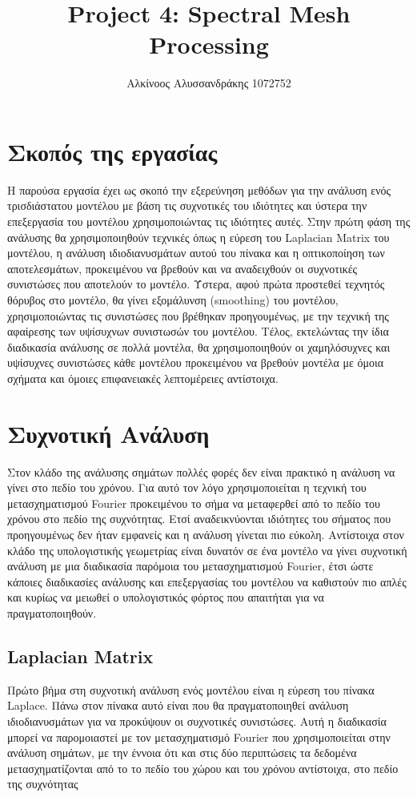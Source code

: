 \documentclass{article}
\title{Project 4: Spectral Mesh Processing}
\author{Αλκίνοος Αλυσσανδράκης 1072752}
\date{}
\begin{document}
\maketitle

\vfill
\tableofcontents
\vfill
\newpage

\section{Σκοπός της εργασίας}
Η παρούσα εργασία έχει ως σκοπό την εξερεύνηση μεθόδων για την ανάλυση ενός τρισδιάστατου
μοντέλου με βάση τις συχνοτικές του ιδιότητες και ύστερα την επεξεργασία του
μοντέλου χρησιμοποιώντας τις ιδιότητες αυτές. Στην πρώτη φάση της ανάλυσης θα
χρησιμοποιηθούν τεχνικές όπως η εύρεση του Laplacian Matrix του μοντέλου, η ανάλυση
ιδιοδιανυσμάτων αυτού του πίνακα και η οπτικοποίηση των αποτελεσμάτων, προκειμένου να
βρεθούν και να αναδειχθούν οι συχνοτικές συνιστώσες που αποτελούν το μοντέλο. Ύστερα,
αφού πρώτα προστεθεί τεχνητός θόρυβος στο μοντέλο, θα γίνει εξομάλυνση (smoothing) του
μοντέλου, χρησιμοποιώντας τις συνιστώσες που βρέθηκαν προηγουμένως, με την τεχνική της
αφαίρεσης των υψίσυχνων συνιστωσών του μοντέλου. Τέλος, εκτελώντας την ίδια διαδικασία
ανάλυσης σε πολλά μοντέλα, θα χρησιμοποιηθούν οι χαμηλόσυχνες και υψίσυχνες συνιστώσες
κάθε μοντέλου προκειμένου να βρεθούν μοντέλα με όμοια σχήματα και όμοιες επιφανειακές
λεπτομέρειες αντίστοιχα.

\section{Συχνοτική Ανάλυση}
Στον κλάδο της ανάλυσης σημάτων πολλές φορές δεν είναι πρακτικό η ανάλυση να γίνει στο
πεδίο του χρόνου. Για αυτό τον λόγο χρησιμοποιείται η τεχνική του μετασχηματισμού
Fourier προκειμένου το σήμα να μεταφερθεί από το πεδίο του χρόνου στο πεδίο της
συχνότητας. Ετσί αναδεικνύονται ιδιότητες του σήματος που προηγουμένως δεν ήταν εμφανείς
και η ανάλυση γίνεται πιο εύκολη. Αντίστοιχα στον κλάδο της υπολογιστικής γεωμετρίας
είναι δυνατόν σε ένα μοντέλο να γίνει συχνοτική ανάλυση με μια διαδικασία παρόμοια του
μετασχηματισμού Fourier, έτσι ώστε κάποιες διαδικασίες ανάλυσης και επεξεργασίας του
μοντέλου να καθιστούν πιο απλές και κυρίως να μειωθεί ο υπολογιστικός φόρτος που
απαιτήται για να πραγματοποιηθούν.

\subsection{Laplacian Matrix}
Πρώτο βήμα στη συχνοτική ανάλυση ενός μοντέλου είναι η εύρεση του πίνακα Laplace. Πάνω
στον πίνακα αυτό είναι που θα πραγματοποιηθεί ανάλυση ιδιοδιανυσμάτων για να προκύψουν οι
συχνοτικές συνιστώσες. Αυτή η διαδικασία μπορεί να παρομοιαστεί με τον μετασχηματισμό
Fourier που χρησιμοποιείται στην ανάλυση σημάτων, με την έννοια ότι και στις δύο
περιπτώσεις τα δεδομένα μετασχηματίζονται από το το πεδίο του χώρου και του χρόνου
αντίστοιχα, στο πεδίο της συχνότητας
\end{document}
